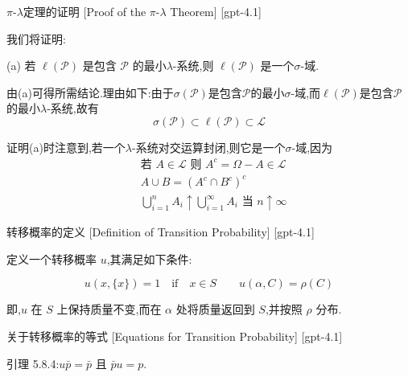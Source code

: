 \documentclass[UTF8]{ctexart}
\begin{document}
    \begin{prf}
        {$\pi$-$\lambda$定理的证明}
        [Proof of the $\pi$-$\lambda$ Theorem]
        [gpt-4.1]
        
我们将证明:

(a) 若 $\ell(\mathcal{P})$ 是包含 $\mathcal{P}$ 的最小$\lambda$-系统,则 $\ell(\mathcal{P})$ 是一个$\sigma$-域.

由(a)可得所需结论.理由如下:由于$\sigma(\mathcal{P})$是包含$\mathcal{P}$的最小$\sigma$-域,而$\ell(\mathcal{P})$是包含$\mathcal{P}$的最小$\lambda$-系统,故有
\[
\sigma(\mathcal{P}) \subset \ell(\mathcal{P}) \subset \mathcal{L}
\]

证明(a)时注意到,若一个$\lambda$-系统对交运算封闭,则它是一个$\sigma$-域,因为
\[
\begin{array}{rl}
& \text{若 } A \in \mathcal{L} \text{ 则 } A^{c} = \Omega - A \in \mathcal{L} \\
& A \cup B = (A^{c} \cap B^{c})^{c} \\
& \bigcup_{i=1}^{n} A_{i} \uparrow \bigcup_{i=1}^{\infty} A_{i} \text{ 当 } n \uparrow \infty
\end{array}
\]

    \end{prf}
    
    
    
    \begin{dfn}
        {转移概率的定义}
        [Definition of Transition Probability]
        [gpt-4.1]
        
定义一个转移概率 $
u$,其满足如下条件:

\[
u(x, \{x\}) = 1 \quad \mathrm{if} \quad x \in S \qquad 
u(\alpha, C) = \rho(C)
\]

即,$
u$ 在 $S$ 上保持质量不变,而在 $\alpha$ 处将质量返回到 $S$,并按照 $\rho$ 分布.

    \end{dfn}
    
    
    
    \begin{lma}
        {关于转移概率的等式}
        [Equations for Transition Probability]
        [gpt-4.1]
        
引理 5.8.4:$
u \bar{p} = \bar{p}$ 且 $\bar{p} 
u = p$.

    \end{lma}
    
    
    
\end{document}
